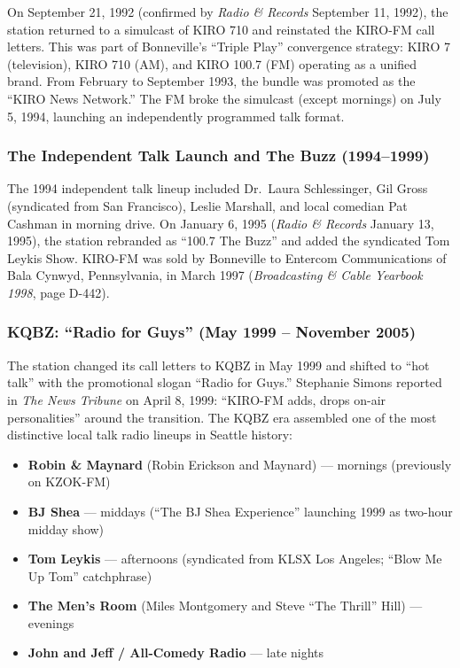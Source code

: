\documentclass[11pt,letterpaper]{article}
\begin{document}
On September 21, 1992 (confirmed by \textit{Radio \& Records} September 11, 1992), the station returned to a simulcast of KIRO 710 and reinstated the KIRO-FM call letters. This was part of Bonneville's ``Triple Play'' convergence strategy: KIRO 7 (television), KIRO 710 (AM), and KIRO 100.7 (FM) operating as a unified brand. From February to September 1993, the bundle was promoted as the ``KIRO News Network.'' The FM broke the simulcast (except mornings) on July 5, 1994, launching an independently programmed talk format.

\subsubsection{The Independent Talk Launch and The Buzz (1994--1999)}

The 1994 independent talk lineup included Dr.\ Laura Schlessinger, Gil Gross (syndicated from San Francisco), Leslie Marshall, and local comedian Pat Cashman in morning drive. On January 6, 1995 (\textit{Radio \& Records} January 13, 1995), the station rebranded as ``100.7 The Buzz'' and added the syndicated Tom Leykis Show. KIRO-FM was sold by Bonneville to Entercom Communications of Bala Cynwyd, Pennsylvania, in March 1997 (\textit{Broadcasting \& Cable Yearbook 1998}, page D-442).

\subsubsection{KQBZ: ``Radio for Guys'' (May 1999 -- November 2005)}

The station changed its call letters to KQBZ in May 1999 and shifted to ``hot talk'' with the promotional slogan ``Radio for Guys.'' Stephanie Simons reported in \textit{The News Tribune} on April 8, 1999: ``KIRO-FM adds, drops on-air personalities'' around the transition. The KQBZ era assembled one of the most distinctive local talk radio lineups in Seattle history:

\begin{itemize}[leftmargin=2em]
  \item \textbf{Robin \& Maynard} (Robin Erickson and Maynard) --- mornings (previously on KZOK-FM)
  \item \textbf{BJ Shea} --- middays (``The BJ Shea Experience'' launching 1999 as two-hour midday show)
  \item \textbf{Tom Leykis} --- afternoons (syndicated from KLSX Los Angeles; ``Blow Me Up Tom'' catchphrase)
  \item \textbf{The Men's Room} (Miles Montgomery and Steve ``The Thrill'' Hill) --- evenings
  \item \textbf{John and Jeff / All-Comedy Radio} --- late nights
\end{itemize}
\end{document}
